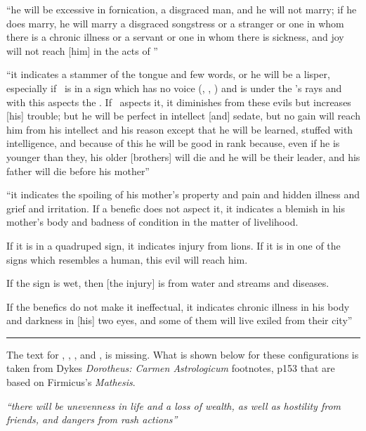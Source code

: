 \begin{description}[style=multiline,leftmargin=1.5cm]
\item[\Saturn\Opposition\Venus] ``he will be excessive in fornication, a disgraced man, and he will not marry; if he does marry, he will marry a disgraced songstress or a stranger or one in whom there is a chronic illness or a servant or one in whom there is sickness, and joy will not reach [him] in the acts of \Venus''

\item[\Saturn\Opposition\Mercury] ``it indicates a stammer of the tongue and few words, or he will be a lisper, especially if \Mercury\, is in a sign which has no voice (\Cancer, \Scorpio, \Pisces) and is under the \Sun's rays and with this aspects the \Moon. If \Mars\, aspects it, it diminishes from these evils but increases [his] trouble; but he will be perfect in intellect [and] sedate, but no gain will reach him from his intellect and his reason except that he will be learned, stuffed with intelligence, and because of this he will be good in rank because, even if he is younger than they, his older [brothers] will die and he will be their leader, and his father will die before his mother''

\item[\Saturn\Opposition\Moon]
``it indicates the spoiling of his mother's property and pain and hidden illness and grief and irritation. If a benefic does not aspect
it, it indicates a blemish in his mother's body and badness of condition in the matter of livelihood. 

If it is in a quadruped sign, it indicates injury from lions. If it is in one of the signs which resembles a human, this evil will reach him. 

If the sign is wet, then [the injury] is from water and streams and diseases. 

If the benefics do not make it ineffectual, it indicates chronic illness in his body and darkness in [his] two eyes, and some of them will  live exiled from their city''
\vspace{0.5em}\hrule

\begin{mdframed}[backgroundcolor=cyan!5, rightmargin=1em, leftmargin=1em]
The text for \Jupiter\Opposition\Mars, \Sun, \Venus, and \Mercury, is missing. What is shown below for these configurations is taken from Dykes \textsl{Dorotheus: Carmen Astrologicum} footnotes, p153 that are based on Firmicus's \textsl{Mathesis}.
\end{mdframed}

\item[\Jupiter\Opposition\Mars] \textsl{``there will be unevenness in life and a loss of wealth, as well as hostility from friends, and dangers from rash actions''}


\end{description}
